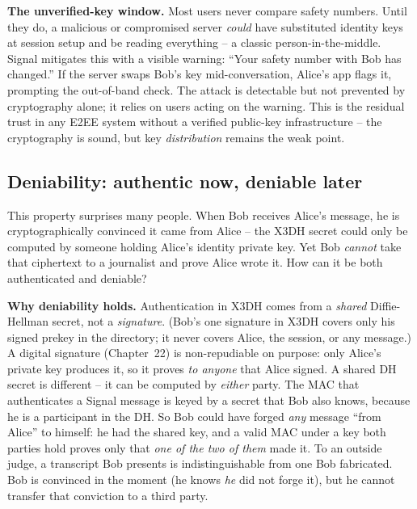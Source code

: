 \begin{attackbox}
\textbf{The unverified-key window.} Most users never compare safety numbers. Until they do, a malicious or compromised server \emph{could} have substituted identity keys at session setup and be reading everything -- a classic person-in-the-middle. Signal mitigates this with a visible warning: ``Your safety number with Bob has changed.'' If the server swaps Bob's key mid-conversation, Alice's app flags it, prompting the out-of-band check. The attack is detectable but not prevented by cryptography alone; it relies on users acting on the warning. This is the residual trust in any E2EE system without a verified public-key infrastructure -- the cryptography is sound, but key \emph{distribution} remains the weak point.
\end{attackbox}

\subsection{Deniability: authentic now, deniable later}
\label{ch27:deniability-property}

This property surprises many people. When Bob receives Alice's message, he is cryptographically convinced it came from Alice -- the X3DH secret could only be computed by someone holding Alice's identity private key. Yet Bob \emph{cannot} take that ciphertext to a journalist and prove Alice wrote it. How can it be both authenticated and deniable?

\begin{whybox}
\textbf{Why deniability holds.} Authentication in X3DH comes from a \emph{shared} Diffie-Hellman secret, not a \emph{signature}. (Bob's one signature in X3DH covers only his signed prekey in the directory; it never covers Alice, the session, or any message.) A digital signature (Chapter~22) is non-repudiable on purpose: only Alice's private key produces it, so it proves \emph{to anyone} that Alice signed. A shared DH secret is different -- it can be computed by \emph{either} party. The MAC that authenticates a Signal message is keyed by a secret that Bob also knows, because he is a participant in the DH. So Bob could have forged \emph{any} message ``from Alice'' to himself: he had the shared key, and a valid MAC under a key both parties hold proves only that \emph{one of the two of them} made it. To an outside judge, a transcript Bob presents is indistinguishable from one Bob fabricated. Bob is convinced in the moment (he knows \emph{he} did not forge it), but he cannot transfer that conviction to a third party.
\end{whybox}

